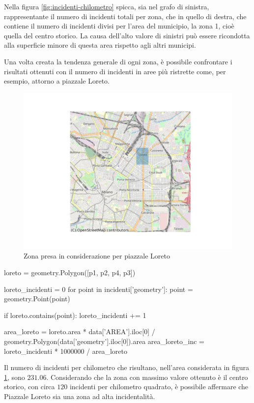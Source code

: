 \documentclass[a4paper,12pt]{report}
\begin{document}
Nella figura \ref{fig:incidenti-chilometro} spicca, sia nel grafo di sinistra, rappresentante 
il numero di incidenti totali per zona, che in 
quello di destra, che contiene il numero di incidenti divisi per l'area del municipio, 
la zona 1, cioè quella del centro storico. 
La causa dell'alto valore di sinistri può essere ricondotta alla superficie minore 
di questa area rispetto agli altri municipi. 

Una volta creata la tendenza generale di ogni zona, è possibile confrontare i risultati 
ottenuti con il numero di incidenti in aree più ristrette come, per esempio, 
attorno a piazzale Loreto. 

\begin{figure}
    \hfill\includegraphics[width=0.7\linewidth]{../src/municipi_milano/zona_loreto.png}\hspace*{\fill}
    \caption{Zona presa in considerazione per piazzale Loreto}
    \label{fig:zona-loreto}
\end{figure}

\begin{code}
loreto = geometry.Polygon([p1, p2, p4, p3])

loreto_incidenti = 0
for point in incidenti['geometry']: 
    point = geometry.Point(point)

    if loreto.contains(point): 
        loreto_incidenti += 1

area_loreto = loreto.area * data['AREA'].iloc[0] / geometry.Polygon(data['geometry'].iloc[0]).area
area_loreto_inc = loreto_incidenti * 1000000 / area_loreto
\end{code}

Il numero di incidenti per chilometro che risultano, nell'area considerata in figura 
\ref{fig:zona-loreto}, sono $231.06$. 
Considerando che la zona con massimo valore ottenuto è il centro storico, 
con circa $120$ incidenti per chilometro quadrato, è possibile affermare 
che Piazzale Loreto sia una zona ad alta incidentalità. 
\end{document}
